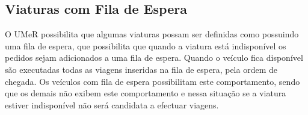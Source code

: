 \subsection{Viaturas com Fila de Espera}
O UMeR possibilita que algumas viaturas possam ser definidas como possuindo uma fila de espera, que possibilita que quando a viatura está indisponível os pedidos sejam adicionados a uma fila de espera. Quando o veículo fica disponível são executadas todas as viagens inseridas na fila de espera, pela ordem de chegada. Os veículos com fila de espera possibilitam este comportamento, sendo que os demais não exibem este comportamento e nessa situação se a viatura estiver indisponível não será candidata a efectuar viagens.
